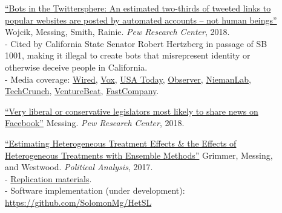 \documentclass[letterpaper,11pt]{article}
\begin{document}
\begin{description}
\item[] \href{http://www.pewinternet.org/2018/04/09/bots-in-the-twittersphere/}{``Bots in the Twittersphere: An estimated two-thirds of tweeted links to popular websites are posted by automated accounts – not human beings''} Wojcik, Messing, Smith, Rainie. 
\emph{Pew Research Center}, 2018.  \\
- Cited by California State Senator Robert Hertzberg in passage of SB 1001, making it illegal to create bots that misrepresent identity or otherwise deceive people in California. \\
- Media coverage: \href{https://www.wired.com/story/twitter-bots-links/}{Wired}, \href{https://www.vox.com/technology/2018/4/9/17214720/pew-study-bots-generate-two-thirds-of-twitter-links}{Vox}, \href{https://www.usatoday.com/story/tech/news/2018/04/09/bots-rampant-twitter-study-says-network-tries-thwart-devious-tweets/492536002/}{USA Today}, \href{http://observer.com/2018/04/report-bots-promote-66-percent-twittersphere-links/}{Observer}, \href{http://www.niemanlab.org/2018/04/think-your-articles-are-getting-a-lot-of-attention-on-twitter-it-could-be-a-lot-of-posting-by-bots/}{NiemanLab}, \href{https://techcrunch.com/2018/04/09/bots-on-twitter-share-two-thirds-of-links-to-popular-websites-pew/}{TechCrunch}, \href{https://venturebeat.com/2018/04/09/pew-twitter-bots-are-behind-66-of-tweeted-links-for-most-popular-sites/}{VentureBeat}, \href{https://www.fastcompany.com/40556233/twitter-bots-are-getting-busy-making-sure-your-tweet-goes-viral}{FastCompany}.

\item[] \href{https://www.pewresearch.org/fact-tank/2018/01/19/very-liberal-or-conservative-legislators-most-likely-to-share-news-on-facebook//}{``Very liberal or conservative legislators most likely to share news on Facebook''} Messing. 
\emph{Pew Research Center}, 2018.  \\

\item[] \href{https://pages.shanti.virginia.edu/PolMeth/files/2013/07/GrimmerMessingWestwood.pdf}{``Estimating Heterogeneous Treatment Effects \& the Effects of Heterogeneous Treatments with Ensemble Methods''} Grimmer, Messing, and Westwood.
\emph{Political Analysis}, 2017. \\
- \href{http://dx.doi.org/10.7910/DVN/BQMLQW}{Replication materials}. \\
- Software implementation (under development): \url{https://github.com/SolomonMg/HetSL}


\end{description}
\end{document}
